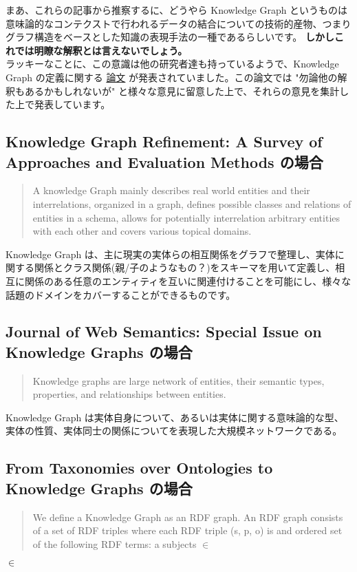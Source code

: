 \documentclass[a4paper, dvipdfmx, 10pt]{article}
\begin{document}
まあ、これらの記事から推察するに、どうやら Knowledge Graph というものは意味論的なコンテクストで行われるデータの結合についての技術的産物、つまりグラフ構造をベースとした知識の表現手法の一種であるらしいです。 \textbf{しかしこれでは明瞭な解釈とは言えないでしょう。}\\

ラッキーなことに、この意識は他の研究者達も持っているようで、Knowledge Graph の定義に関する \href{http://ceur-ws.org/Vol-1695/paper4.pdf}{論文} が発表されていました。この論文では "勿論他の解釈もあるかもしれないが" と様々な意見に留意した上で、それらの意見を集計した上で発表しています。\\


\subsection{Knowledge Graph Refinement: A Survey of Approaches and Evaluation Methods の場合}
\label{sec:orge868152}
\begin{quote}
A knowledge Graph mainly describes real world entities and their interrelations, organized in a graph, defines possible classes and relations of entities in a schema,  allows for potentially interrelation arbitrary entities with each other and covers various topical domains.\\
\end{quote}


Knowledge Graph は、主に現実の実体らの相互関係をグラフで整理し、実体に関する関係とクラス関係(親/子のようなもの？)をスキーマを用いて定義し、相互に関係のある任意のエンティティを互いに関連付けることを可能にし、様々な話題のドメインをカバーすることができるものです。\\

\subsection{Journal of Web Semantics: Special Issue on Knowledge Graphs の場合}
\label{sec:org29209ca}
\begin{quote}
Knowledge graphs are large network of entities, their semantic types, properties,  and relationships between entities.\\
\end{quote}

Knowledge Graph は実体自身について、あるいは実体に関する意味論的な型、実体の性質、実体同士の関係についてを表現した大規模ネットワークである。\\

\subsection{From Taxonomies over Ontologies to Knowledge Graphs の場合}
\label{sec:org394dee3}
\begin{quote}
We define a Knowledge Graph as an RDF graph. An RDF graph consists of a set of RDF triples where each RDF triple (s, p, o) is and ordered set of the following RDF terms: a subjects \(\in\) \\
\end{quote}
\(\in\) \\
\end{document}
